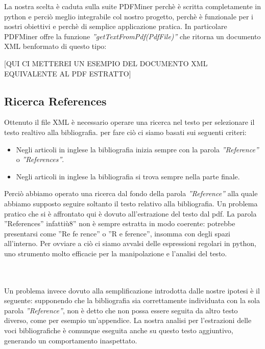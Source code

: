 La nostra scelta è caduta sulla suite PDFMiner perchè è scritta completamente in python e perciò meglio integrabile col nostro progetto, perchè è funzionale per i nostri obiettivi e perchè di semplice applicazione pratica.
In particolare PDFMiner offre la funzione \textit{''getTextFromPdf(PdfFile)''} che ritorna un documento XML benformato di questo tipo:

[QUI CI METTEREI UN ESEMPIO DEL DOCUMENTO XML EQUIVALENTE AL PDF ESTRATTO]


\subsection{Ricerca References}

Ottenuto il file XML è necessario operare una ricerca nel testo per selezionare il testo realtivo alla bibliografia.
per fare ciò ci siamo basati sui seguenti criteri:
\begin{itemize}
 \item Negli articoli in inglese la bibliografia inizia sempre con la parola \textit{''Reference''} o \textit{''References''}.
 \item Negli articoli in inglese la bibliografia si trova sempre nella parte finale.
\end{itemize}

Perciò abbiamo operato una ricerca dal fondo della parola \textit{''Reference''} alla quale abbiamo supposto seguire soltanto il testo relativo alla bibliografia. 
Un problema pratico che si è affrontato qui è dovuto all'estrazione del testo dal pdf. La parola ''References'' infattiù8'' non è sempre estratta in modo coerente: potrebbe presentarsi come ''Re fe rence'' o ''R e ference'', insomma con degli spazi all'interno. Per ovviare a ciò ci siamo avvalsi delle espressioni regolari in python, uno strumento molto efficacie per la manipolazione e l'analisi del testo.

\\
[Sottosezione e regressione sulle RegExp con esempio di nostro utilizzo???]
\\

Un problema invece dovuto alla semplificazione introdotta dalle nostre ipotesi è il seguente: supponendo che la bibliografia sia correttamente individuata con la sola parola \textit{''Reference''}, non è detto che non possa essere seguita da altro testo diverso, come per esempio un'appendice. La nostra analisi per l'estrazioni delle voci bibliografiche è comunque eseguita anche su questo testo aggiuntivo, generando un comportamento inaspettato.



